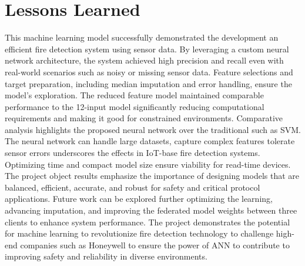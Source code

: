 \documentclass[conference]{IEEEtran}
\begin{document}
\section{Lessons Learned}
This machine learning model successfully demonstrated the
development an efficient fire detection system using sensor
data. By leveraging a custom neural network architecture,
the system achieved high precision and recall even with
real-world scenarios such as noisy or missing sensor data.
Feature selections and target preparation, including median
imputation and error handling, ensure the model's
exploration. The reduced feature model maintained comparable
performance to the 12-input model significantly reducing
computational requirements and making it good for
constrained environments. Comparative analysis highlights
the proposed neural network over the traditional such as
SVM. The neural network can handle large datasets, capture
complex features tolerate sensor errors underscores the
effects in IoT-base fire detection systems. Optimizing time
and compact model size ensure viability for read-time
devices. The project object results emphasize the importance
of designing models that are balanced, efficient, accurate,
and robust for safety and critical protocol applications.
Future work can be explored further optimizing the learning,
advancing imputation, and improving the federated model
weights between three clients to enhance system performance.
The project demonstrates the potential for machine learning
to revolutionize fire detection technology to challenge
high-end companies such as Honeywell to ensure the power of
ANN to contribute to improving safety and reliability in
diverse environments.
\end{document}
